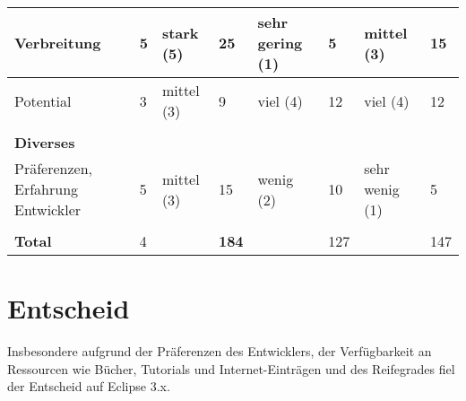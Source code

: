 \begin{longtable}{|p{2.8cm}|p{0.7cm}|p{2.1cm}|p{0.7cm}|p{2.1cm}|p{0.7cm}|p{2.2cm}|p{0.7cm}|}
  Verbreitung & 5 & stark (5) & 25 & sehr gering (1) &5&mittel (3)&15 \\\hline
  Potential & 3 & mittel (3) & 9 & viel (4)  & 12 & viel (4)&12 \\\hline
 \multicolumn{8}{|l|}{}\\
\multicolumn{8}{|l|}{\textbf{Diverses}}\\\hline
  Präferenzen, Erfahrung Entwickler & 5 & mittel (3) & 15 & wenig (2) &10&sehr wenig (1)&5 \\\hline
 \multicolumn{8}{|l|}{}\\\hline 
 \textbf{Total} & 4 & &\textbf{184}&&127& & 147 \\\hline
\end{longtable}


\section{Entscheid}
Insbesondere aufgrund der Präferenzen des Entwicklers, der Verfügbarkeit an Ressourcen wie Bücher, Tutorials und Internet-Einträgen und des Reifegrades fiel der Entscheid auf Eclipse 3.x. 






